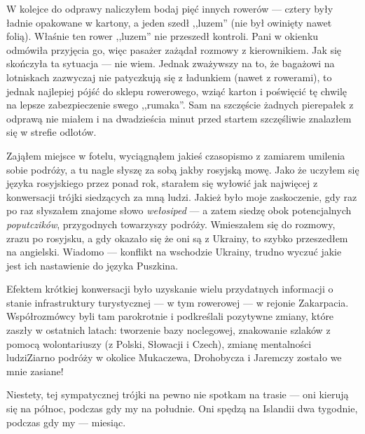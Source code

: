 
W kolejce do odprawy naliczyłem bodaj pięć innych rowerów --- cztery były ładnie opakowane w kartony, a jeden szedł ,,luzem'' (nie był owinięty nawet folią). Właśnie ten rower ,,luzem'' nie przeszedł kontroli. Pani w okienku odmówiła przyjęcia go, więc pasażer zażądał rozmowy z kierownikiem. Jak się skończyła ta sytuacja --- nie wiem. Jednak zważywszy na to, że bagażowi na lotniskach zazwyczaj nie patyczkują się z ładunkiem (nawet z rowerami), to jednak najlepiej pójść do sklepu rowerowego, wziąć karton i poświęcić tę chwilę na lepsze zabezpieczenie swego ,,rumaka''. Sam na szczęście żadnych pierepałek z odprawą nie miałem i na dwadzieścia minut przed startem szczęśliwie znalazłem się w strefie odlotów.

Zająłem miejsce w fotelu, wyciągnąłem jakieś czasopismo z zamiarem umilenia sobie podróży, a tu nagle słyszę za sobą jakby rosyjską mowę. Jako że uczyłem się języka rosyjskiego przez ponad rok, starałem się wyłowić jak najwięcej z konwersacji trójki siedzących za mną ludzi. Jakież było moje zaskoczenie, gdy raz po raz słyszałem znajome słowo \emph{wełosiped} --- a zatem siedzę obok potencjalnych \emph{poputczików}, przygodnych towarzyszy podróży. Wmieszałem się do rozmowy, zrazu po rosyjsku, a gdy okazało się że oni są z Ukrainy, to szybko przeszedłem na angielski. Wiadomo --- konflikt na wschodzie Ukrainy, trudno wyczuć jakie jest ich nastawienie do języka Puszkina.

Efektem krótkiej konwersacji było uzyskanie wielu przydatnych informacji o stanie infrastruktury turystycznej --- w tym rowerowej --- w rejonie Zakarpacia. Współrozmówcy byli tam parokrotnie i podkreślali pozytywne zmiany, które zaszły w ostatnich latach: tworzenie bazy noclegowej, znakowanie szlaków z pomocą wolontariuszy (z Polski, Słowacji i Czech), zmianę mentalności ludzi\textellipsis  Ziarno podróży w okolice Mukaczewa, Drohobycza i Jaremczy zostało we mnie zasiane!

Niestety, tej sympatycznej trójki na pewno nie spotkam na trasie --- oni kierują się na północ, podczas gdy my na południe. Oni spędzą na Islandii dwa tygodnie, podczas gdy my --- miesiąc.

